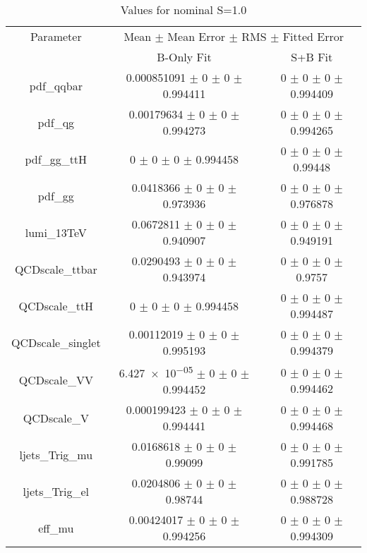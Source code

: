 \begin{table}
\centering
\caption{Values for nominal S=1.0}
\begin{tabular}{ccc}
\toprule
Parameter & \multicolumn{2}{c}{Mean $\pm$ Mean Error $\pm$ RMS $\pm$ Fitted Error}\\
 & B-Only Fit & S+B Fit\\
\midrule
pdf\_qqbar & \num{0.000851091} $\pm$ \num{0} $\pm$ \num{0} $\pm$ \num{0.994411} & \num{0} $\pm$ \num{0} $\pm$ \num{0} $\pm$ \num{0.994409}\\
pdf\_qg & \num{0.00179634} $\pm$ \num{0} $\pm$ \num{0} $\pm$ \num{0.994273} & \num{0} $\pm$ \num{0} $\pm$ \num{0} $\pm$ \num{0.994265}\\
pdf\_gg\_ttH & \num{0} $\pm$ \num{0} $\pm$ \num{0} $\pm$ \num{0.994458} & \num{0} $\pm$ \num{0} $\pm$ \num{0} $\pm$ \num{0.99448}\\
pdf\_gg & \num{0.0418366} $\pm$ \num{0} $\pm$ \num{0} $\pm$ \num{0.973936} & \num{0} $\pm$ \num{0} $\pm$ \num{0} $\pm$ \num{0.976878}\\
lumi\_13TeV & \num{0.0672811} $\pm$ \num{0} $\pm$ \num{0} $\pm$ \num{0.940907} & \num{0} $\pm$ \num{0} $\pm$ \num{0} $\pm$ \num{0.949191}\\
QCDscale\_ttbar & \num{0.0290493} $\pm$ \num{0} $\pm$ \num{0} $\pm$ \num{0.943974} & \num{0} $\pm$ \num{0} $\pm$ \num{0} $\pm$ \num{0.9757}\\
QCDscale\_ttH & \num{0} $\pm$ \num{0} $\pm$ \num{0} $\pm$ \num{0.994458} & \num{0} $\pm$ \num{0} $\pm$ \num{0} $\pm$ \num{0.994487}\\
QCDscale\_singlet & \num{0.00112019} $\pm$ \num{0} $\pm$ \num{0} $\pm$ \num{0.995193} & \num{0} $\pm$ \num{0} $\pm$ \num{0} $\pm$ \num{0.994379}\\
QCDscale\_VV & \num{6.427e-05} $\pm$ \num{0} $\pm$ \num{0} $\pm$ \num{0.994452} & \num{0} $\pm$ \num{0} $\pm$ \num{0} $\pm$ \num{0.994462}\\
QCDscale\_V & \num{0.000199423} $\pm$ \num{0} $\pm$ \num{0} $\pm$ \num{0.994441} & \num{0} $\pm$ \num{0} $\pm$ \num{0} $\pm$ \num{0.994468}\\
ljets\_Trig\_mu & \num{0.0168618} $\pm$ \num{0} $\pm$ \num{0} $\pm$ \num{0.99099} & \num{0} $\pm$ \num{0} $\pm$ \num{0} $\pm$ \num{0.991785}\\
ljets\_Trig\_el & \num{0.0204806} $\pm$ \num{0} $\pm$ \num{0} $\pm$ \num{0.98744} & \num{0} $\pm$ \num{0} $\pm$ \num{0} $\pm$ \num{0.988728}\\
eff\_mu & \num{0.00424017} $\pm$ \num{0} $\pm$ \num{0} $\pm$ \num{0.994256} & \num{0} $\pm$ \num{0} $\pm$ \num{0} $\pm$ \num{0.994309}\\

\end{tabular}
\end{table}
